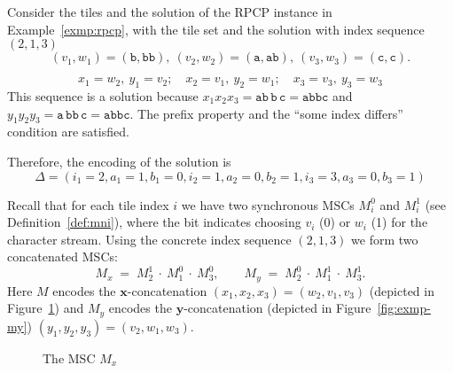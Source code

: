 \begin{example}
Consider the tiles and the solution of the RPCP instance 
in Example~\ref{exmp:rpcp}, with the tile set and the solution
with index sequence $(2,1,3)$
$$
 (v_1,w_1)=(\texttt{b},\texttt{bb}),\ 
 (v_2,w_2)=(\texttt{a},\texttt{ab}),\ 
 (v_3,w_3)=(\texttt{c},\texttt{c}).
$$

$$
 x_1=w_2,\ y_1=v_2;\quad x_2=v_1,\ y_2=w_1;\quad x_3=v_3,\ y_3=w_3
$$
This sequence is a solution because
$x_1x_2x_3=\texttt{ab}\,\texttt{b}\,\texttt{c}=\texttt{abbc}$ and
$y_1y_2y_3=\texttt{a}\,\texttt{bb}\,\texttt{c}=\texttt{abbc}$. The
prefix property and the ``some index differs'' condition are satisfied.

Therefore, the encoding of the solution is
$$\Delta = (i_1=2,a_1=1,b_1=0,i_2=1,a_2=0,b_2=1,i_3=3,a_3=0,b_3=1)$$

Recall that for each tile index \(i\) we have two synchronous MSCs
\(M_i^0\) and \(M_i^1\) (see Definition~\ref{def:mni}), where the bit
indicates choosing \(v_i\) (0) or \(w_i\) (1) for the character stream.
Using the concrete index sequence \((2,1,3)\) we form two
concatenated MSCs:
\[
  M_x\;=\; M^{1}_{2}\ \cdot\ M^{0}_{1}\ \cdot\ M^{0}_{3},
\qquad
  M_y\;=\; M^{0}_{2}\ \cdot\ M^{1}_{1}\ \cdot\ M^{1}_{3}.
\]
Here \(M\) encodes the \(\mathbf{x}\)-concatenation
\((x_1,x_2,x_3)=(w_2,v_1,v_3)\) (depicted 
in Figure~\ref{fig:exmp-mx}) and \(M_y\) encodes 
the \(\mathbf{y}\)-concatenation (depicted in 
Figure~\ref{fig:exmp-my}) \((y_1,y_2,y_3)=(v_2,w_1,w_3)\).

\begin{figure}[!ht]
\centering
\begin{msc}[draw frame=none, draw head=none, msc keyword=, head height=0px, label distance=0.5ex, foot height=0px, foot distance=0px]{}
	\declinst{P2}{P2}{}



\end{msc}
\caption{The MSC $M_x$}
\label{fig:exmp-mx}
\end{figure}


\end{example}
